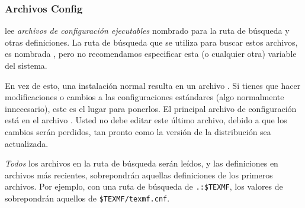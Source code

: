 \documentclass{article}
\begin{document}
\subsubsection{Archivos Config}

\KPS{} lee \emph{archivos de configuración ejecutables} nombrado
 para la ruta de búsqueda y otras
definiciones. La ruta de búsqueda que se utiliza para buscar
estos archivos, es nombrada , pero no
recomendamos especificar esta (o cualquier otra) variable del
sistema. 

En vez de esto, una instalación normal resulta en un archivo
. Si tienes que hacer modificaciones o
cambios a las configuraciones estándares (algo normalmente
innecesario), este es el lugar para ponerlos. El principal archivo de
configuración está en el archivo
.  Usted no debe editar este
último archivo, debido a que los cambios serán perdidos, tan pronto
como la versión de la distribución sea actualizada. 

\emph{Todos} los archivos  en la ruta de
búsqueda serán leídos, y las definiciones en archivos más
recientes, sobrepondrán aquellas definiciones de los primeros archivos. Por
ejemplo, con una ruta de búsqueda de \verb|.:$TEXMF|, los
valores de  sobrepondrán aquellos de
\verb|$TEXMF/texmf.cnf|.
\end{document}
